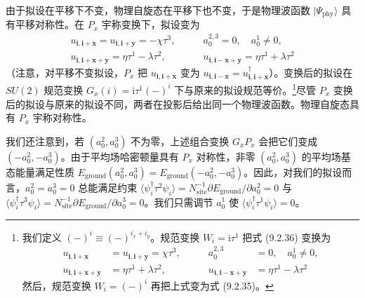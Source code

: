 由于拟设在平移下不变，物理自旋态在平移下也不变，于是物理波函数 $|\Psi_{\mathrm{phy}}\rangle$ 具有平移对称性。在 $P_x$ 宇称变换下，拟设变为
\begin{align*}
u_{\pmb{i},\pmb{i}+\pmb{x}}=u_{\pmb{i},\pmb{i}+\pmb{y}}=-\chi\tau^{3},\qquad & a_0^{2,3}=0,\quad a_0^{1}\neq 0,\\
u_{\pmb{i},\pmb{i}+\pmb{x}+\pmb{y}}=\eta\tau^{1}-\lambda\tau^{2},\qquad & u_{\pmb{i},\pmb{i}-\pmb{x}+\pmb{y}}=\eta\tau^{1}+\lambda\tau^{2}
\tag{9.2.36}
\end{align*}
（注意，对平移不变拟设，$P_x$ 把 $u_{\pmb{i},\pmb{i}+\pmb{x}}$ 变为 $u_{\pmb{i},\pmb{i}-\pmb{x}}=u_{\pmb{i},\pmb{i}+\pmb{x}}^{\dagger}$）。变换后的拟设在 $SU(2)$ 规范变换 $G_x(i)=\mathrm{i}\tau^{1}(-)^{i}$ 下与原来的拟设规范等价。\footnote{我们定义 $(-)^{i}\equiv(-)^{i_x+i_y}$。规范变换 $W_i=\mathrm{i}\tau^{1}$ 把式 (9.2.36) 变换为
\begin{equation*}
\begin{aligned}
u_{\pmb{i},\pmb{i}+\pmb{x}}&=u_{\pmb{i},\pmb{i}+\pmb{y}}=\chi\tau^{3},\qquad & a_0^{2,3}&=0,\quad a_0^{1}\neq 0,\\
u_{\pmb{i},\pmb{i}+\pmb{x}+\pmb{y}}&=\eta\tau^{1}+\lambda\tau^{2},\qquad & u_{\pmb{i},\pmb{i}-\pmb{x}+\pmb{y}}&=\eta\tau^{1}-\lambda\tau^{2}
\end{aligned}
\end{equation*}
然后，规范变换 $W_i=(-)^{i}$ 再把上式变为式 (9.2.35)。}尽管 $P_x$ 变换后的拟设与原来的拟设不同，两者在投影后给出同一个物理波函数。物理自旋态具有 $P_x$ 宇称对称性。

我们还注意到，若 $(a_0^{2},a_0^{3})$ 不为零，上述组合变换 $G_xP_x$ 会把它们变成 $(-a_0^{2},-a_0^{3})$。由于平均场哈密顿量具有 $P_x$ 对称性，非零 $(a_0^{2},a_0^{3})$ 的平均场基态能量满足性质 $E_{\mathrm{ground}}(a_0^{2},a_0^{3})=E_{\mathrm{ground}}(-a_0^{2},-a_0^{3})$。因此，对我们的拟设而言，$a_0^{2}=a_0^{3}=0$ 总能满足约束 $\langle\psi_i^{\dagger}\tau^{2}\psi_i\rangle\allowbreak=N_{\mathrm{site}}^{-1}\partial E_{\mathrm{ground}}/\partial a_0^{2}\allowbreak=0$ 与 $\langle\psi_i^{\dagger}\tau^{3}\psi_i\rangle\allowbreak=N_{\mathrm{site}}^{-1}\partial E_{\mathrm{ground}}/\partial a_0^{3}\allowbreak=0$。我们只需调节 $a_0^{1}$ 使 $\langle\psi_i^{\dagger}\tau^{1}\psi_i\rangle=0$。

